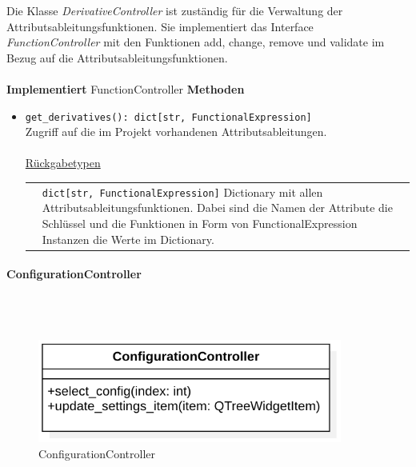 \documentclass{article}
\newcommand{\classheader}[2][]{\paragraph{#2}
\mbox{}\textit{#1}\\\\}
\begin{document}
Die Klasse \textit{DerivativeController} ist zuständig für die Verwaltung der Attributsableitungsfunktionen. Sie implementiert das Interface \textit{FunctionController} mit den Funktionen add, change, remove und validate im Bezug auf die Attributsableitungsfunktionen.\\\\
\textbf{\large{Implementiert}} FunctionController 
\textbf{\large{Methoden}}
\begin{itemize}
\item \texttt{get\_derivatives(): dict[str, FunctionalExpression]}\\ Zugriff auf die im Projekt vorhandenen Attributsableitungen.\\\\
\underline{{Rückgabetypen}}\\
\begin{tabular}{lp{10.7cm}}
 & \texttt{dict[str, FunctionalExpression]}  Dictionary mit allen Attributsableitungsfunktionen. Dabei sind die Namen der Attribute die Schlüssel und die Funktionen in Form von FunctionalExpression Instanzen die Werte im Dictionary.\\
\end{tabular}
\end{itemize}

\newpage
\classheader{ConfigurationController}\label{cls:ConfigurationController}

\begin{figure}[H]%
    \centering
    \includegraphics[width=10cm]{entwurf/Floriane/ConfigurationController.png}
    \caption{ConfigurationController}
\end{figure}
\end{document}
